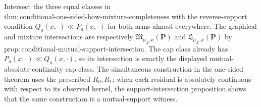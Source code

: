 Intersect the three equal classes in \(\mathrm{thm:conditional\text{-}one\text{-}sided\text{-}bow\text{-}mixture\text{-}completeness}\) with the reverse-support condition \(Q_a(x,\cdot)\ll P_a(x,\cdot)\) for both arms almost everywhere.  The graphical and mixture intersections are respectively \(\mathfrak M_{\mu_X,\boldsymbol e}(\boldsymbol P)\) and \(\mathfrak L_{\mu_X,\boldsymbol e}(\boldsymbol P)\) by \(\mathrm{prop:conditional\text{-}mutual\text{-}support\text{-}intersection}\).  The cap class already has \(P_a(x,\cdot)\ll Q_a(x,\cdot)\), so its intersection is exactly the displayed mutual-absolute-continuity cap class.  The simultaneous construction in the one-sided theorem uses the prescribed \(R_0,R_1\); when each residual is absolutely continuous with respect to its observed kernel, the support-intersection proposition shows that the same construction is a mutual-support witness.
